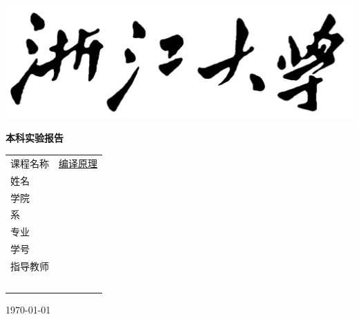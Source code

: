 \documentclass{article}
\begin{document}

\thispagestyle{empty}
\setcounter{page}{-1}

\begin{center}
    \includegraphics[width=0.5\paperwidth]{logo.png}
\end{center}

\vskip 20pt

\begin{center}
    \textbf{本科实验报告}
\end{center}


\vskip 120pt

    \begin{center}
        \bfseries {}

        \begin{tabularx}{.7\textwidth}{>{\fangsong}l >{\fangsong}X<{\centering}}
            课程名称 & \uline{\hfill 编译原理 \hfill} \\
            姓名 &  \uline{\hfill \hfill} \\
            学院 &  \uline{\hfill \hfill} \\
            系 &  \uline{\hfill \hfill} \\
            专业 &  \uline{\hfill \hfill} \\
            学号 &  \uline{\hfill \hfill} \\
            指导教师 &  \uline{\hfill \hfill} \\
            ~ & ~\\
        \end{tabularx}
    \end{center}

\vskip 100pt

\begin{center}
     \fangsong
    \today
\end{center}



\newpage

\thispagestyle{empty}

\tableofcontents
\end{document}
